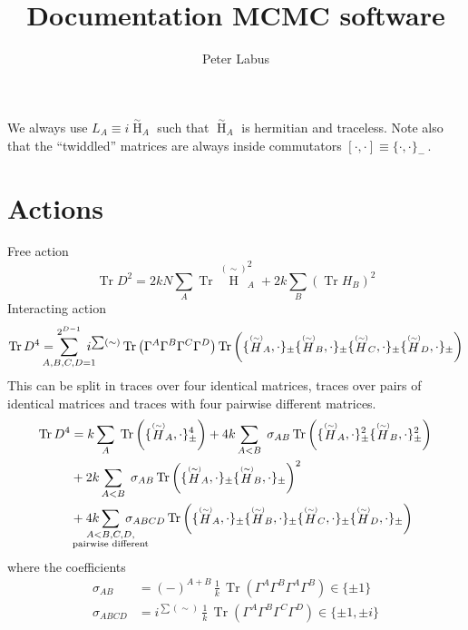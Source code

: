 \documentclass[10pt,a4paper]{article}
\author{Peter Labus}
\title{Documentation MCMC software}
\newcommand\ptwid[1]{\mathord{\mathop{#1}\limits^{\scriptscriptstyle(\sim)}}}
\newcommand\twid[1]{\mathord{\mathop{#1}\limits^{\scriptscriptstyle\sim}}}
\DeclareMathOperator{\Tr}{Tr}
\begin{document}
\maketitle

We always use $L_A \equiv i \twid H_A$ such that $\twid H_A$
is hermitian and traceless.
Note also that the ``twiddled'' matrices are always inside
commutators $[\cdot,\cdot] \equiv \{\cdot,\cdot\}_{-}\,$.

\section{Actions}

Free action
\begin{equation}
  \Tr D^2 = 2kN \sum_{A}  \Tr \ptwid H_A^2
  + 2k \sum_{B}  ( \Tr H_B )^2
\end{equation}
Interacting action
\begin{equation}
  \Tr D^4 = \sum_{\mathclap{A,B,C,D=1}}^{2^{D-1}} \; i^{\sum (\sim)}  \Tr \left(\Gamma^A \Gamma^B \Gamma^C \Gamma^D \right)
 \Tr \left( \{ \ptwid H_A, \cdot \}_{\pm}
 \{ \ptwid H_B, \cdot \}_{\pm}
 \{ \ptwid H_C, \cdot \}_{\pm}
 \{ \ptwid H_D, \cdot \}_{\pm} \right)
\end{equation}
This can be split in traces over four identical matrices, traces over
pairs of identical matrices and traces with
four pairwise different matrices.
\begin{align}
  \Tr D^4 &= k \sum_{A} \; \Tr \left( \{ \ptwid H_A, \cdot \}_{\pm}^4 \right) +
4k \sum_{A<B} \; \sigma_{AB}
\Tr \left( \{ \ptwid H_A, \cdot \}_{\pm}^2   \{ \ptwid H_B, \cdot \}_{\pm}^2 \right) \\
&+ 2k \sum_{A<B} \; \sigma_{AB}
\Tr \left( \{ \ptwid H_A, \cdot \}_{\pm}   \{ \ptwid H_B, \cdot \}_{\pm} \right)^2 \\
&+ 4k
\sum_{\mathclap{\substack{A<B,C,D,\\ \text{pairwise different}  }}} \;
\sigma_{ABCD}  \Tr \left( \{ \ptwid H_A, \cdot \}_{\pm}   \{ \ptwid H_B, \cdot \}_{\pm}
\{ \ptwid H_C, \cdot \}_{\pm}   \{ \ptwid H_D, \cdot \}_{\pm} \right)
\end{align}
where the coefficients
\begin{align}
\sigma_{AB} &=  (-)^{A+B} \, \frac{1}{k} \, \Tr \left(\Gamma^A \Gamma^B \Gamma^A \Gamma^B \right) \in \{\pm 1\}\\
  \sigma_{ABCD} &=  i^{\sum (\sim)} \, \frac{1}{k} \, \Tr \left(\Gamma^A \Gamma^B \Gamma^C \Gamma^D \right) \in \{\pm 1, \pm i\}
\end{align}
\end{document}
